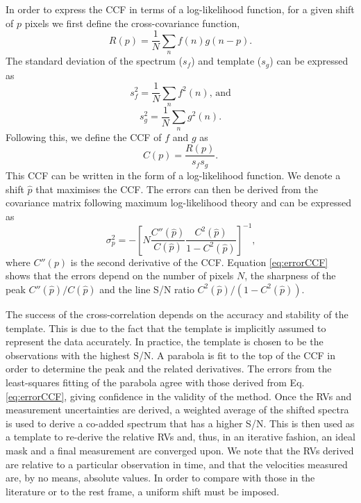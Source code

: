 In order to express the CCF in terms of a log-likelihood function, for a given shift of $p$ pixels we first define the cross-covariance function,
\begin{equation}
R(p) =\frac{1}{N}\sum_n f(n) g(n-p)\textrm{.}
\end{equation}
The standard deviation of the spectrum ($s_f$) and template ($s_g$) can be expressed as
\begin{equation}
s_f^2 = \frac{1}{N} \sum_n f^2 (n) \textrm{, and}
\end{equation}
\begin{equation}
s_g^2 = \frac{1}{N} \sum_n g^2 (n) \textrm{.}
\end{equation}
Following this, we define the CCF of $f$ and $g$ as
\begin{equation}
C(p) = \frac{R(p)}{s_f s_g} \textrm{.}
\end{equation}
This CCF can be written in the form of a log-likelihood function. We denote a shift $\hat{p}$ that maximises the CCF. The errors can then be derived from the covariance matrix following maximum log-likelihood theory and can be expressed as
\begin{equation}
\sigma_p^2 = - \left[N \frac{C''(\hat{p})}{C(\hat{p})} \frac{C^2(\hat{p})}{1 - C^2(\hat{p})} \right]^{-1} \textrm{,}
\label{eq:errorCCF}
\end{equation}
where $C''(p)$ is the second derivative of the CCF. Equation \ref{eq:errorCCF} shows that the errors depend on the number of pixels $N$, the sharpness of the peak $C''(\hat{p}) / C(\hat{p})$ and the line S/N ratio $C^2(\hat{p}) / (1 - C^2(\hat{p}))$.

The success of the cross-correlation depends on the accuracy and stability of the template. This is due to the fact that the template is implicitly assumed to represent the data accurately. In practice, the template is chosen to be the observations with the highest S/N. A parabola is fit to the top of the CCF in order to determine the peak and the related derivatives. The errors from the least-squares fitting of the parabola agree with those derived from Eq. \ref{eq:errorCCF}, giving confidence in the validity of the method. Once the RVs and measurement uncertainties are derived, a weighted average of the shifted spectra is used to derive a co-added spectrum that has a higher S/N. This is then used as a template to re-derive the relative RVs and, thus, in an iterative fashion, an ideal mask and a final measurement are converged upon. We note that the RVs derived are relative to a particular observation in time, and that the velocities measured are, by no means, absolute values. In order to compare with those in the literature or to the rest frame, a uniform shift must be imposed.

